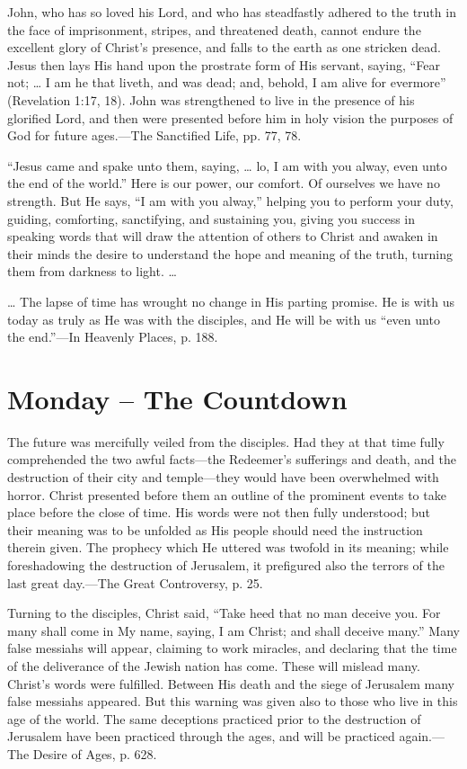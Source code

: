 \documentclass[a4paper, 10pt, twoside, headings=small]{scrartcl}
\begin{document}
\begin{multicols}{2}
John, who has so loved his Lord, and who has steadfastly adhered to the truth in the face of imprisonment, stripes, and threatened death, cannot endure the excellent glory of Christ’s presence, and falls to the earth as one stricken dead. Jesus then lays His hand upon the prostrate form of His servant, saying, “Fear not; … I am he that liveth, and was dead; and, behold, I am alive for evermore” (Revelation 1:17, 18). John was strengthened to live in the presence of his glorified Lord, and then were presented before him in holy vision the purposes of God for future ages.—The Sanctified Life, pp. 77, 78.

“Jesus came and spake unto them, saying, … lo, I am with you alway, even unto the end of the world.” Here is our power, our comfort. Of ourselves we have no strength. But He says, “I am with you alway,” helping you to perform your duty, guiding, comforting, sanctifying, and sustaining you, giving you success in speaking words that will draw the attention of others to Christ and awaken in their minds the desire to understand the hope and meaning of the truth, turning them from darkness to light. …

… The lapse of time has wrought no change in His parting promise. He is with us today as truly as He was with the disciples, and He will be with us “even unto the end.”—In Heavenly Places, p. 188.

\section*{Monday – The Countdown}

The future was mercifully veiled from the disciples. Had they at that time fully comprehended the two awful facts—the Redeemer’s sufferings and death, and the destruction of their city and temple—they would have been overwhelmed with horror. Christ presented before them an outline of the prominent events to take place before the close of time. His words were not then fully understood; but their meaning was to be unfolded as His people should need the instruction therein given. The prophecy which He uttered was twofold in its meaning; while foreshadowing the destruction of Jerusalem, it prefigured also the terrors of the last great day.—The Great Controversy, p. 25.

Turning to the disciples, Christ said, “Take heed that no man deceive you. For many shall come in My name, saying, I am Christ; and shall deceive many.” Many false messiahs will appear, claiming to work miracles, and declaring that the time of the deliverance of the Jewish nation has come. These will mislead many. Christ’s words were fulfilled. Between His death and the siege of Jerusalem many false messiahs appeared. But this warning was given also to those who live in this age of the world. The same deceptions practiced prior to the destruction of Jerusalem have been practiced through the ages, and will be practiced again.—The Desire of Ages, p. 628.


\end{multicols}
\end{document}
